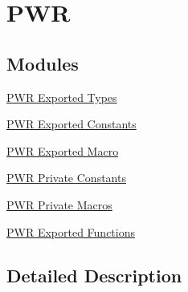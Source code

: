 \hypertarget{group___p_w_r}{}\section{P\+WR}
\label{group___p_w_r}
\subsection*{Modules}
\begin{DoxyCompactItemize}
\item 
\hyperlink{group___p_w_r___exported___types}{P\+W\+R Exported Types}
\item 
\hyperlink{group___p_w_r___exported___constants}{P\+W\+R Exported Constants}
\item 
\hyperlink{group___p_w_r___exported___macro}{P\+W\+R Exported Macro}
\item 
\hyperlink{group___p_w_r___private___constants}{P\+W\+R Private Constants}
\item 
\hyperlink{group___p_w_r___private___macros}{P\+W\+R Private Macros}
\item 
\hyperlink{group___p_w_r___exported___functions}{P\+W\+R Exported Functions}
\end{DoxyCompactItemize}


\subsection{Detailed Description}
